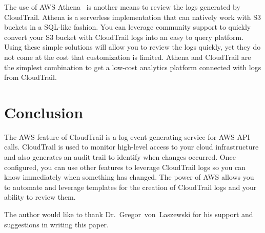 The use of AWS Athena~\cite{hid-sp18-518-CloudTrail-Athena} is another means
to review the logs generated by CloudTrail. Athena is a serverless 
implementation that can natively work with S3 buckets in a SQL-like fashion.
You can leverage community support to quickly convert your S3 bucket with
CloudTrail logs into an easy to query platform. Using these simple solutions
will allow you to review the logs quickly, yet they do not come at the cost 
that customization is limited. Athena and CloudTrail are the simplest 
combination to get a low-cost analytics platform connected with logs from
CloudTrail.

\section{Conclusion}

The AWS feature of CloudTrail is a log event generating service for AWS API 
calls. CloudTrail is used to monitor high-level access to your cloud 
infrastructure and also generates an audit trail to identify when changes 
occurred. Once configured, you can use other features to leverage CloudTrail 
logs so you can know immediately when something has changed. The power of AWS 
 allows you to automate and leverage templates for the creation of CloudTrail
 logs and your ability to review them.

\begin{acks}

The author would like to thank Dr.~Gregor~von~Laszewski for his support and 
suggestions in writing this paper.

\end{acks}


 

